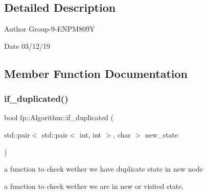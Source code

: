 \subsection{Detailed Description}
\begin{DoxyAuthor}{Author}
Group-\/9-\/\+E\+N\+P\+M809Y 
\end{DoxyAuthor}
\begin{DoxyDate}{Date}
03/12/19 
\end{DoxyDate}


\subsection{Member Function Documentation}
\mbox{\label{classfp_1_1_algorithm_a92571327e87248eb1afc706d571e47e0}} 
\subsubsection{\texorpdfstring{if\+\_\+duplicated()}{if\_duplicated()}}
{\footnotesize\ttfamily bool fp\+::\+Algorithm\+::if\+\_\+duplicated (\begin{DoxyParamCaption}\item[{std\+::pair$<$ std\+::pair$<$ int, int $>$, char $>$}]{new\+\_\+state }\end{DoxyParamCaption})}



a function to check wether we have duplicate state in new node 

a function to check wether we are in new or visited state.


